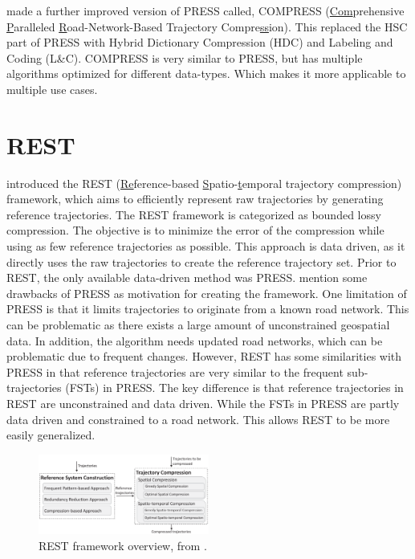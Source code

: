 \textcite{han2017compress} made a further improved version of PRESS called, COMPRESS (\underline{Com}prehensive \underline{P}aralleled \underline{R}oad-Network-Based Trajectory Compre\underline{ss}ion). This replaced the HSC part of PRESS with Hybrid Dictionary Compression (HDC) and Labeling and Coding (L\&C). COMPRESS is very similar to PRESS, but has multiple algorithms optimized for different data-types. Which makes it more applicable to multiple use cases.



\section{REST}
\label{sec:REST}
\textcite{zhao2018rest} introduced the REST (\underline{Re}ference-based \underline{S}patio-\underline{t}emporal trajectory compression) framework, which aims to efficiently represent raw trajectories by generating reference trajectories. The REST framework is categorized as bounded lossy compression. The objective is to minimize the error of the compression while using as few reference trajectories as possible. This approach is data driven, as it directly uses the raw trajectories to create the reference trajectory set.  Prior to REST, the only available data-driven method was PRESS. \textcite{zhao2018rest} mention some drawbacks of PRESS as motivation for creating the framework. One limitation of PRESS is that it limits trajectories to originate from a known road network. This can be problematic as there exists a large amount of unconstrained geospatial data. In addition, the algorithm needs updated road networks, which can be problematic due to frequent changes. However, REST has some similarities with PRESS in that reference trajectories are very similar to the frequent sub-trajectories (FSTs) in PRESS. The key difference is that reference trajectories in REST are unconstrained and data driven. While the FSTs in PRESS are partly data driven and constrained to a road network. This allows REST to be more easily generalized.

\begin{figure}
    \includegraphics[width=0.5\textwidth]{./figures/rest_structure.png}
    \caption{REST framework overview, from \cite{zhao2018rest}.}
    \label{fig:rest_overview}
\end{figure}

